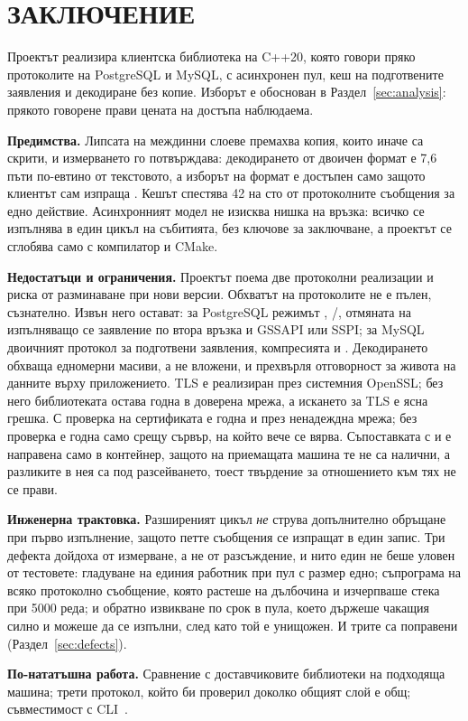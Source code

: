 \section*{ЗАКЛЮЧЕНИЕ}
\label{sec:conclusion}

Проектът реализира клиентска библиотека на C++20, която говори пряко протоколите на PostgreSQL
и MySQL, с асинхронен пул, кеш на подготвените заявления и декодиране без копие. Изборът е
обоснован в Раздел~\ref{sec:analysis}: прякото говорене прави цената на достъпа наблюдаема.

\textbf{Предимства.} Липсата на междинни слоеве премахва копия, които иначе са скрити, и
измерването го потвърждава: декодирането от двоичен формат е 7,6 пъти по-евтино от текстовото,
а изборът на формат е достъпен само защото клиентът сам изпраща . Кешът спестява 42
на сто от протоколните съобщения за едно действие. Асинхронният модел не изисква нишка на
връзка: всичко се изпълнява в един цикъл на събитията, без ключове за заключване, а проектът
се сглобява само с компилатор и CMake.

\textbf{Недостатъци и ограничения.} Проектът поема две протоколни реализации и риска от
разминаване при нови версии. Обхватът на протоколите не е пълен, съзнателно. Извън него
остават: за PostgreSQL режимът ,
/, отмяната на изпълняващо се заявление по втора връзка и
GSSAPI или SSPI; за MySQL двоичният протокол за подготвени заявления, компресията и
.
Декодирането обхваща едномерни масиви, а не вложени, и прехвърля отговорност за живота на
данните върху приложението. TLS е реализиран през системния OpenSSL; без него библиотеката
остава годна в доверена мрежа, а искането за TLS е ясна грешка. С проверка на сертификата е
годна и през ненадеждна мрежа; без проверка е годна само срещу сървър, на който вече се вярва.
Съпоставката с  и  е направена само в контейнер,
защото на приемащата машина те не са налични, а разликите в нея са под разсейването, тоест
твърдение за отношението към тях не се прави.

\textbf{Инженерна трактовка.} Разширеният цикъл \emph{не} струва допълнително обръщане при
първо изпълнение, защото петте съобщения се изпращат в един запис. Три дефекта дойдоха от
измерване, а не от разсъждение, и нито един не беше уловен от тестовете: гладуване на единия
работник при пул с размер едно; съпрограма на всяко протоколно съобщение, която растеше на
дълбочина и изчерпваше стека при 5000 реда; и обратно извикване по срок в пула, което държеше
чакащия силно и можеше да се изпълни, след като той е унищожен. И трите са поправени
(Раздел~\ref{sec:defects}).

\textbf{По-нататъшна работа.} Сравнение с доставчиковите библиотеки на подходяща машина;
трети протокол, който би проверил доколко общият слой е общ; съвместимост с CLI~\cite{sql_cli}.
